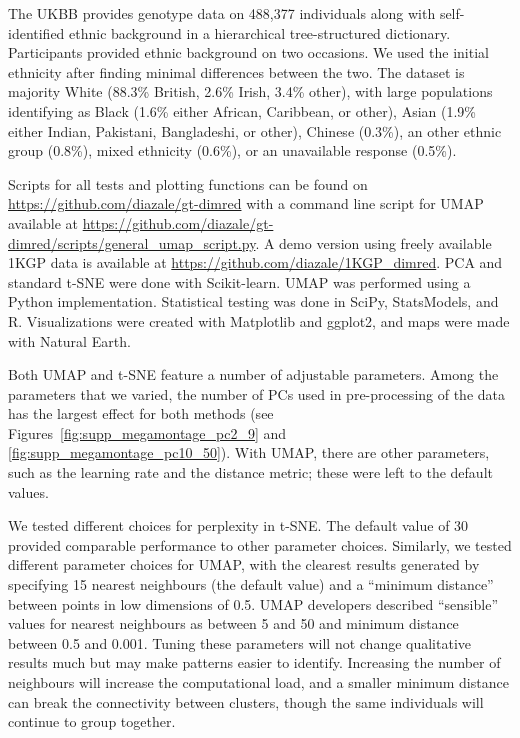 The UKBB provides genotype data on 488,377 individuals along with self-identified ethnic background in a hierarchical tree-structured dictionary. Participants provided ethnic background on two occasions. We used the initial ethnicity after finding minimal differences between the two. The dataset is majority White (88.3\% British, 2.6\% Irish, 3.4\% other), with large populations identifying as Black (1.6\% either African, Caribbean, or other), Asian (1.9\% either Indian, Pakistani, Bangladeshi, or other), Chinese (0.3\%), an other ethnic group (0.8\%), mixed ethnicity (0.6\%), or an unavailable response (0.5\%). 

Scripts for all tests and plotting functions can be found on \url{https://github.com/diazale/gt-dimred} with a command line script for UMAP available at \url{https://github.com/diazale/gt-dimred/scripts/general_umap_script.py}. A demo version using freely available 1KGP data is available at \url{https://github.com/diazale/1KGP_dimred}. PCA and standard t-SNE were done with Scikit-learn\citep{scikit-learn}. UMAP was performed using a Python implementation\citep{2018arXivUMAP}. Statistical testing was done in SciPy\citep{scipy}, StatsModels\citep{seabold2010statsmodels}, and R\citep{r2013}. Visualizations were created with Matplotlib\citep{Hunter2007} and ggplot2\citep{ggplot2016}, and maps were made with Natural Earth.

Both UMAP and t-SNE feature a number of adjustable parameters. Among the parameters that we varied, the number of PCs used in pre-processing of the data has the largest effect for both methods (see Figures~\ref{fig:supp_megamontage_pc2_9} and \ref{fig:supp_megamontage_pc10_50}). With UMAP, there are other parameters, such as the learning rate and the distance metric; these were left to the default values.

We tested different choices for perplexity in t-SNE. The default value of 30 provided comparable performance to other parameter choices.  Similarly, we tested different parameter choices for UMAP, with the clearest results generated by specifying 15 nearest neighbours (the default value) and a ``minimum distance'' between points in low dimensions of 0.5. UMAP developers described ``sensible'' values for nearest neighbours as between 5 and 50 and minimum distance between 0.5 and 0.001. Tuning these parameters will not change qualitative results much but may make patterns easier to identify. Increasing the number of neighbours will increase the computational load, and a smaller minimum distance can break the connectivity between clusters, though the same individuals will continue to group together.

